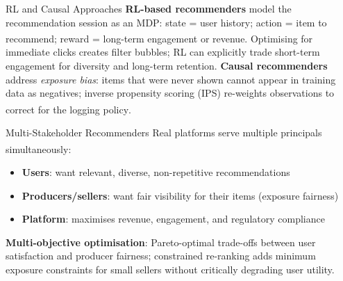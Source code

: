 \begin{v3topic}{RL and Causal Approaches}
    \textbf{RL-based recommenders} model the recommendation session as an MDP: state = user history; action = item to recommend; reward = long-term engagement or revenue\textsuperscript{\cite[][pp.~470--475]{suttonReinforcementLearningIntroduction2018}}.
    Optimising for immediate clicks creates filter bubbles; RL can explicitly trade short-term engagement for diversity and long-term retention.
    \textbf{Causal recommenders} address \emph{exposure bias}: items that were never shown cannot appear in training data as negatives; inverse propensity scoring (IPS) re-weights observations to correct for the logging policy\textsuperscript{\cite[][pp.~22--30]{pearlCausalInferenceStatistics2016}}.

\end{v3topic}
\begin{v3topic}{Multi-Stakeholder Recommenders}
    Real platforms serve multiple principals simultaneously\textsuperscript{\cite[][pp.~105--110]{aggarwalRecommenderSystems2016}}:
    \begin{itemize}
        \item \textbf{Users}: want relevant, diverse, non-repetitive recommendations
        \item \textbf{Producers/sellers}: want fair visibility for their items (exposure fairness)
        \item \textbf{Platform}: maximises revenue, engagement, and regulatory compliance
    \end{itemize}
    \textbf{Multi-objective optimisation}: Pareto-optimal trade-offs between user satisfaction and producer fairness; constrained re-ranking adds minimum exposure constraints for small sellers without critically degrading user utility.

\end{v3topic}

%
